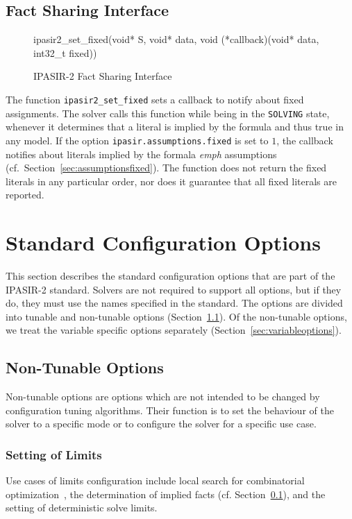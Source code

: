 \documentclass[sat]{iosart2x}
\begin{document}
\subsection{Fact Sharing Interface}\label{sec:factsharing}

\begin{figure}[t]
\tt\raggedright
ipasir2\_set\_fixed(void* S, void* data, void (*callback)(void* data, int32\_t fixed))
\caption{IPASIR-2 Fact Sharing Interface}
\end{figure}

The function \texttt{ipasir2\_set\_fixed} sets a callback to notify about fixed assignments.
The solver calls this function while being in the \texttt{SOLVING} state, whenever it determines that a literal is implied by the formula and thus true in any model.
If the option \texttt{ipasir.assumptions.fixed} is set to $1$, the callback notifies about literals implied by the formala \emph{emph} assumptions (cf.~Section~\ref{sec:assumptionsfixed}).
The function does not return the fixed literals in any particular order, nor does it guarantee that all fixed literals are reported.



\section{Standard Configuration Options}

This section describes the standard configuration options that are part of the IPASIR-2 standard.
Solvers are not required to support all options, but if they do, they must use the names specified in the standard.
The options are divided into tunable and non-tunable options (Section~\ref{sec:nontunable}).
Of the non-tunable options, we treat the variable specific options separately (Section~\ref{sec:variableoptions}).

\subsection{Non-Tunable Options}\label{sec:nontunable}

Non-tunable options are options which are not intended to be changed by configuration tuning algorithms.
Their function is to set the behaviour of the solver to a specific mode or to configure the solver for a specific use case.

\subsubsection{Setting of Limits}
Use cases of limits configuration include local search for combinatorial optimization~\cite{Cohen:2021:LSOpt}, the determination of implied facts (cf. Section~\ref{sec:factsharing}), and the setting of deterministic solve limits.
\end{document}
